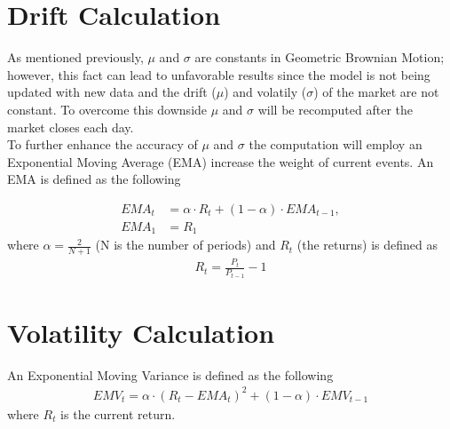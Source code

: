 \documentclass{article}
\begin{document}
\section{Drift Calculation}
As mentioned previously, $\mu$ and $\sigma$ are constants in Geometric Brownian Motion; however, this fact can lead to unfavorable results since the model is not being updated with new data and the drift ($\mu$) and volatily ($\sigma$) of the market are not constant. To overcome this downside $\mu$ and $\sigma$ will be recomputed after the market closes each day.\\
\noindent
To further enhance the accuracy of $\mu$ and $\sigma$ the computation will employ an Exponential Moving Average (EMA) increase the weight of current events. An EMA is defined as the following

\begin{align}
	EMA_t &= \alpha \cdot R_t + (1 - \alpha) \cdot EMA_{t-1},\\
	EMA_1 &= R_1
\end{align}
 where $\alpha  = \frac{2}{N + 1}$ (N is the number of periods) and $R_t$ (the returns) is defined as 
\begin{align}
	R_t = \frac{P_t}{P_{t-1}} - 1
\end{align}

\section{Volatility Calculation}
An Exponential Moving Variance is defined as the following
\begin{align}
	EMV_t = \alpha \cdot \left( R_t - EMA_t \right)^2 + (1 - \alpha) \cdot EMV_{t-1}
\end{align}
where $R_t$ is the current return.


\end{document}
